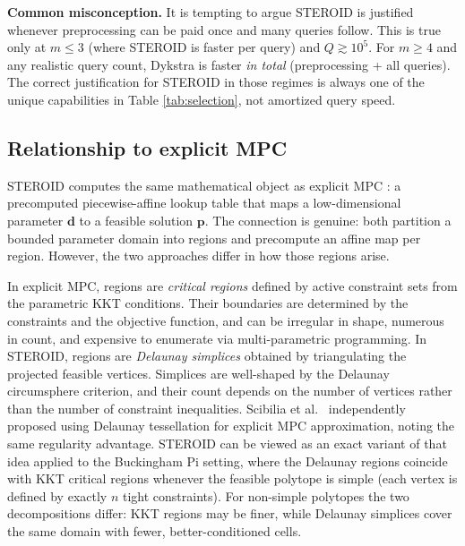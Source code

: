 \documentclass[review,onefignum,onetabnum]{./SIAM_template/siamart171218}
\begin{document}
\textbf{Common misconception.}
It is tempting to argue STEROID is justified whenever preprocessing can be paid once
and many queries follow.  This is true only at $m \leq 3$ (where STEROID is faster
per query) and $Q \gtrsim 10^5$.  For $m \geq 4$ and any realistic query count,
Dykstra is faster \emph{in total} (preprocessing + all queries).  The correct
justification for STEROID in those regimes is always one of the unique capabilities
in Table \ref{tab:selection}, not amortized query speed.

\subsection{Relationship to explicit MPC}
\label{sec:mpc_comparison}

STEROID computes the same mathematical object as explicit MPC \cite{Bemporad2002}:
a precomputed piecewise-affine lookup table that maps a low-dimensional parameter
$\mathbf{d}$ to a feasible solution $\mathbf{p}$.  The connection is genuine: both
partition a bounded parameter domain into regions and precompute an affine map per
region.  However, the two approaches differ in how those regions arise.

In explicit MPC, regions are \emph{critical regions} defined by active constraint
sets from the parametric KKT conditions.  Their boundaries are determined by the
constraints and the objective function, and can be irregular in shape, numerous in
count, and expensive to enumerate via multi-parametric programming.
In STEROID, regions are \emph{Delaunay simplices} obtained by triangulating the
projected feasible vertices.  Simplices are well-shaped by the Delaunay
circumsphere criterion, and their count depends on the number of vertices rather
than the number of constraint inequalities.  Scibilia et al.\ \cite{Scibilia2009}
independently proposed using Delaunay tessellation for explicit MPC approximation,
noting the same regularity advantage.
STEROID can be viewed as an exact variant
of that idea applied to the Buckingham Pi setting, where the Delaunay regions
coincide with KKT critical regions whenever the feasible polytope is simple (each
vertex is defined by exactly $n$ tight constraints).  For non-simple polytopes the
two decompositions differ: KKT regions may be finer, while Delaunay simplices
cover the same domain with fewer, better-conditioned cells.
\end{document}
